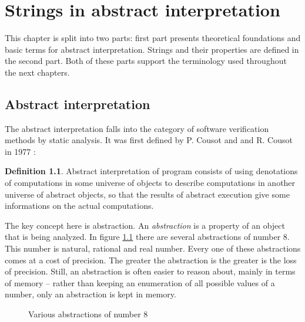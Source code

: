 \documentclass[12pt,final,oneside]{fithesis2}
\theoremstyle{definition}
\newtheorem{definition}{Definition}[chapter]
\begin{document}
\chapter{Strings in abstract interpretation}
\label{chap:preliminaries}

This chapter is split into two parts:
first part presents theoretical foundations and basic terms for
abstract interpretation. Strings and their properties are defined in the
second part. Both of these parts support the terminology used throughout
the next chapters.


\section{Abstract interpretation}
\label{sec:abstractinterpretation}

The abstract interpretation falls into the category of software
verification methods by static analysis. It was first defined by P. Cousot
and and R. Cousot in 1977 \cite{CousotCousot77-1}:

\begin{definition}
Abstract interpretation of program consists of using denotations of
computations in some universe of objects to describe computations in
another universe of abstract objects, so that the results of abstract
execution give some informations on the actual computations.
\end{definition}

The key concept here is abstraction. An \textit{abstraction} is a property
of an object that is being analyzed. In figure \ref{fig:abstraction}
there are several abstractions of number 8. This number is natural,
rational and real number. Every one of these abstractions comes
at a cost of precision. The greater the abstraction is the greater is the
loss of precision. Still, an abstraction is often easier to reason about,
mainly in terms of memory -- rather than keeping an enumeration of all
possible values of a number, only an abstraction is kept in memory.

\begin{figure}[ht]
\centering
{}
\caption{Various abstractions of number 8}
\label{fig:abstraction}
\end{figure}
\end{document}

